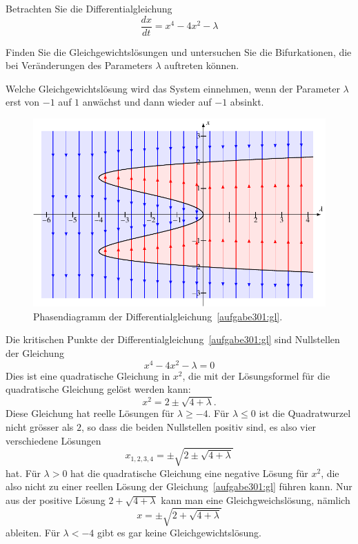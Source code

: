 Betrachten Sie die Differentialgleichung
\begin{equation}
\frac{dx}{dt}
=
x^4-4x^2-\lambda
\label{aufgabe301:gl}
\end{equation}
\begin{teilaufgaben}
\item
Finden Sie die Gleichgewichtslösungen und untersuchen Sie die 
Bifurkationen, die bei Veränderungen des Parameters $\lambda$
auftreten können.
\item
Welche Gleichgewichtslösung wird das System einnehmen, wenn der
Parameter $\lambda$ erst von $-1$ auf $1$ anwächst
und dann wieder auf $-1$ absinkt.
\end{teilaufgaben}

\begin{loesung}
\begin{figure}
\centering
\includegraphics{chapters/3/grad4.pdf}
\caption{Phasendiagramm der Differentialgleichung~\eqref{aufgabe301:gl}.
\label{aufgabe301:fig}}
\end{figure}
\begin{teilaufgaben}
\item
Die kritischen Punkte der Differentialgleichung~\eqref{aufgabe301:gl}
sind Nullstellen der Gleichung
\begin{equation}
x^4-4x^2-\lambda=0
\label{aufgabe301:gl}
\end{equation}
Dies ist eine quadratische Gleichung in $x^2$, die mit der Lösungsformel
für die quadratische Gleichung gelöst werden kann:
\[
x^2 = 2 \pm \sqrt{4+\lambda}.
\]
Diese Gleichung hat reelle Lösungen für $\lambda \ge -4$.
Für $\lambda \le 0$ ist die Quadratwurzel nicht grösser als $2$,
so dass die beiden Nullstellen positiv sind, es also vier verschiedene
Lösungen
\begin{equation}
x_{1,2,3,4} = \pm\sqrt{2\pm\sqrt{4+\lambda}}
\end{equation}
hat.
Für $\lambda >0$ hat die quadratische Gleichung eine negative Lösung
für $x^2$, die also nicht zu einer reellen Lösung der
Gleichung~\eqref{aufgabe301:gl} führen kann.
Nur aus der positive Lösung $2+\sqrt{4+\lambda}$ kann man eine
Gleichgweichslösung, nämlich
\[
x=\pm\sqrt{2+\sqrt{4+\lambda}}
\]
ableiten.
Für $\lambda < -4$ gibt es gar keine Gleichgewichtslösung.


\end{teilaufgaben}
\end{loesung}
